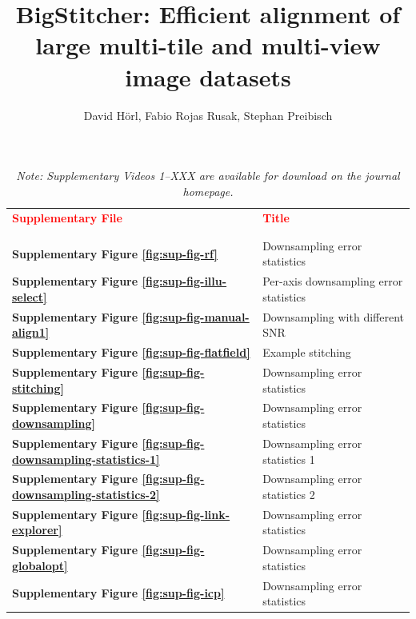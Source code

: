 \documentclass[]{spie}  %
\title{BigStitcher: Efficient alignment of large multi-tile and multi-view image datasets}
\author{David H{\"o}rl, Fabio Rojas Rusak, Stephan Preibisch
}
\newcommand\tablespace{\vspace{2.5mm}}
\begin{document}
\maketitle

\setcounter{page}{1}


\hspace{20mm}

\begin{table}[h!]
\center
{
\fontsize{12pt}{11pt}\selectfont
\center
\begin{tabular}{lp{11cm}}
\textbf{\textcolor{red}{Supplementary File}} & \textbf{\textcolor{red}{Title}}\\ \\
\hline
\\
\textbf{Supplementary Figure \ref{fig:sup-fig-rf}} & Downsampling error statistics \tablespace \\
\textbf{Supplementary Figure \ref{fig:sup-fig-illu-select}} & Per-axis downsampling error statistics \tablespace \\
\textbf{Supplementary Figure \ref{fig:sup-fig-manual-align1}} &  Downsampling with different SNR \tablespace \\
\textbf{Supplementary Figure \ref{fig:sup-fig-flatfield}} & Example stitching \tablespace \\
\textbf{Supplementary Figure \ref{fig:sup-fig-stitching}} & Downsampling error statistics \tablespace \\
\textbf{Supplementary Figure \ref{fig:sup-fig-downsampling}} & Downsampling error statistics \tablespace \\
\textbf{Supplementary Figure \ref{fig:sup-fig-downsampling-statistics-1}} & Downsampling error statistics 1 \tablespace \\
\textbf{Supplementary Figure \ref{fig:sup-fig-downsampling-statistics-2}} & Downsampling error statistics 2 \tablespace \\
\textbf{Supplementary Figure \ref{fig:sup-fig-link-explorer}} & Downsampling error statistics \tablespace \\
\textbf{Supplementary Figure \ref{fig:sup-fig-globalopt}} & Downsampling error statistics \tablespace \\
\textbf{Supplementary Figure \ref{fig:sup-fig-icp}} & Downsampling error statistics \tablespace \\

\end{tabular}}
\caption{\emph{Note: Supplementary Videos 1--XXX are available for download on the journal homepage.}}
\end{table}
\end{document}
